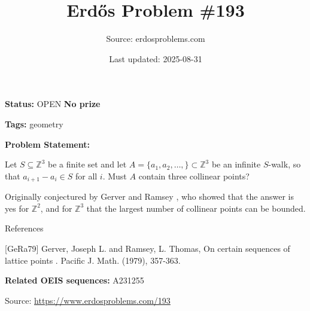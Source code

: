 \documentclass{article}
\title{Erd\H{o}s Problem \#193}
\date{Last updated: 2025-08-31}
\author{Source: erdosproblems.com}
\begin{document}
\maketitle

\noindent\textbf{Status:} OPEN \quad \textbf{No prize}

\noindent\textbf{Tags:} geometry

\medskip

\noindent\textbf{Problem Statement:}

Let $S\subseteq \mathbb{Z}^3$ be a finite set and let $A=\{a_1,a_2,\ldots,\}\subset \mathbb{Z}^3$ be an infinite $S$-walk, so that $a_{i+1}-a_i\in S$ for all $i$. Must $A$ contain three collinear points?




Originally conjectured by Gerver and Ramsey \cite{GeRa79}, who showed that the answer is yes for $\mathbb{Z}^2$, and for $\mathbb{Z}^3$ that the largest number of collinear points can be bounded.




References

[GeRa79] Gerver, Joseph L. and Ramsey, L. Thomas, On certain sequences of lattice points . Pacific J. Math. (1979), 357-363.

\noindent\textbf{Related OEIS sequences:} A231255


\bigskip
\noindent\small{Source: \url{https://www.erdosproblems.com/193}}
\end{document}
